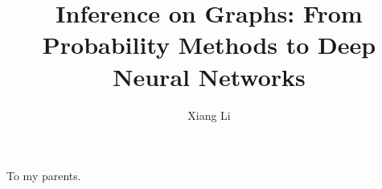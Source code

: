 \documentclass{ucbthesis}
\theoremstyle{definition}
\theoremstyle{remark}
\begin{document}

\title{Inference on Graphs: From Probability Methods to Deep Neural Networks}
\author{Xiang Li}






\maketitle
\approvalpage
\copyrightpage



\begin{frontmatter}

\begin{dedication}
\null\vfil
\begin{center}
To my parents. \\\vspace{12pt}

\end{center}
\vfil\null
\end{dedication}

\tableofcontents
\clearpage
\listoffigures
\clearpage


\begin{acknowledgements}



\end{acknowledgements}

\end{frontmatter}
\end{document}
